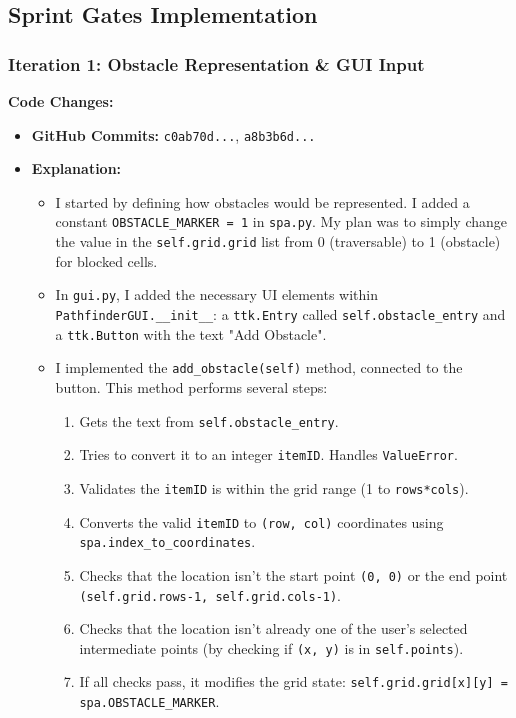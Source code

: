 \clearpage
\subsection{Sprint Gates Implementation}

\subsubsection{Iteration 1: Obstacle Representation \& GUI Input}

\textbf{Code Changes:}
\begin{itemize}
	\item \textbf{GitHub Commits:} \verb|c0ab70d...|, \verb|a8b3b6d...|
	\item \textbf{Explanation:}
	\begin{itemize}
		\item I started by defining how obstacles would be represented. I added a constant \verb|OBSTACLE_MARKER = 1| in \verb|spa.py|. My plan was to simply change the value in the \verb|self.grid.grid| list from 0 (traversable) to 1 (obstacle) for blocked cells.
		\item In \verb|gui.py|, I added the necessary UI elements within \verb|PathfinderGUI.__init__|: a \verb|ttk.Entry| called \verb|self.obstacle_entry| and a \verb|ttk.Button| with the text "Add Obstacle".
		\item I implemented the \verb|add_obstacle(self)| method, connected to the button. This method performs several steps:
		\begin{enumerate}
			\item Gets the text from \verb|self.obstacle_entry|.
			\item Tries to convert it to an integer \verb|itemID|. Handles \verb|ValueError|.
			\item Validates the \verb|itemID| is within the grid range (1 to \verb|rows*cols|).
			\item Converts the valid \verb|itemID| to \verb|(row, col)| coordinates using \verb|spa.index_to_coordinates|.
			\item Checks that the location isn't the start point \verb|(0, 0)| or the end point \verb|(self.grid.rows-1, self.grid.cols-1)|.
			\item Checks that the location isn't already one of the user's selected intermediate points (by checking if \verb|(x, y)| is in \verb|self.points|).
			\item If all checks pass, it modifies the grid state: \verb|self.grid.grid[x][y] = spa.OBSTACLE_MARKER|.

\end{enumerate}
\end{itemize}
\end{itemize}
